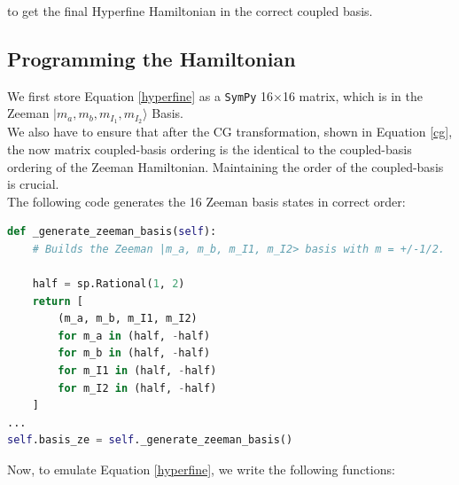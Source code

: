 \documentclass[svgnames]{article}
\begin{document}
to get the final Hyperfine Hamiltonian in the correct coupled basis. 

\subsection{Programming the Hamiltonian}

We first store Equation \ref{hyperfine} as a \verb|SymPy| 16$\times$16 matrix,
which is in the Zeeman $|m_a, m_b, m_{I_1}, m_{I_2}\rangle $ Basis. \\

We also have to ensure that after the CG transformation, shown in
Equation \ref{cg}, the now matrix coupled-basis ordering is the identical to the
coupled-basis ordering of the Zeeman Hamiltonian. Maintaining the order of the
coupled-basis is crucial. \\ 

The following code generates the 16 Zeeman basis states in correct order: 

\begin{lstlisting}[language=Python] 
def _generate_zeeman_basis(self): 
    # Builds the Zeeman |m_a, m_b, m_I1, m_I2> basis with m = +/-1/2.

    half = sp.Rational(1, 2)
    return [
        (m_a, m_b, m_I1, m_I2)
        for m_a in (half, -half)
        for m_b in (half, -half)
        for m_I1 in (half, -half)
        for m_I2 in (half, -half)
    ] 
... 
self.basis_ze = self._generate_zeeman_basis()
\end{lstlisting} 

\vspace{5px}
Now, to emulate Equation \ref{hyperfine}, we write the following functions:
\vspace{5px}
\end{document}
